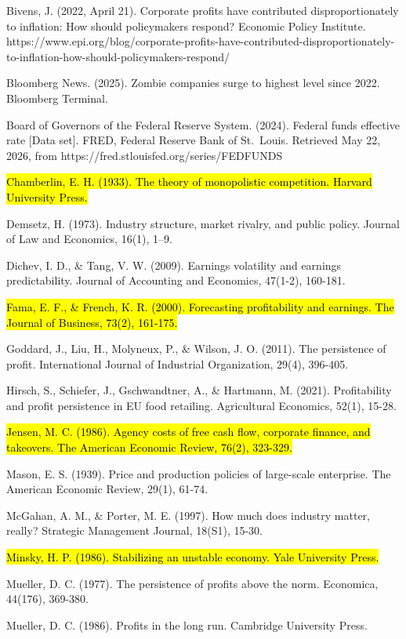 \documentclass[12pt,a4paper]{article}
\begin{document}
Bivens, J. (2022, April 21). Corporate profits have contributed
disproportionately to inflation: How should policymakers respond?
Economic Policy Institute.
https://www.epi.org/blog/corporate-profits-have-contributed-disproportionately-to-inflation-how-should-policymakers-respond/

Bloomberg News. (2025). Zombie companies surge to highest level since
2022. Bloomberg Terminal.

Board of Governors of the Federal Reserve System. (2024). Federal funds
effective rate {[}Data set{]}. FRED, Federal Reserve Bank of St.~Louis.
Retrieved May 22, 2026, from https://fred.stlouisfed.org/series/FEDFUNDS

\hl{Chamberlin, E. H. (1933). The theory of monopolistic competition. Harvard University Press.}

Demsetz, H. (1973). Industry structure, market rivalry, and public
policy. Journal of Law and Economics, 16(1), 1--9.

Dichev, I. D., \& Tang, V. W. (2009). Earnings volatility and earnings
predictability. Journal of Accounting and Economics, 47(1-2), 160-181.

\hl{Fama, E. F., \& French, K. R. (2000). Forecasting profitability and earnings. The Journal of Business, 73(2), 161-175.}

Goddard, J., Liu, H., Molyneux, P., \& Wilson, J. O. (2011). The
persistence of profit. International Journal of Industrial Organization,
29(4), 396-405.

Hirsch, S., Schiefer, J., Gschwandtner, A., \& Hartmann, M. (2021).
Profitability and profit persistence in EU food retailing. Agricultural
Economics, 52(1), 15-28.

\hl{Jensen, M. C. (1986). Agency costs of free cash flow, corporate finance, and takeovers. The American Economic Review, 76(2), 323-329.}

Mason, E. S. (1939). Price and production policies of large-scale
enterprise. The American Economic Review, 29(1), 61-74.

McGahan, A. M., \& Porter, M. E. (1997). How much does industry matter,
really? Strategic Management Journal, 18(S1), 15-30.

\hl{Minsky, H. P. (1986). Stabilizing an unstable economy. Yale University Press.}

Mueller, D. C. (1977). The persistence of profits above the norm.
Economica, 44(176), 369-380.

Mueller, D. C. (1986). Profits in the long run. Cambridge University
Press.
\end{document}
